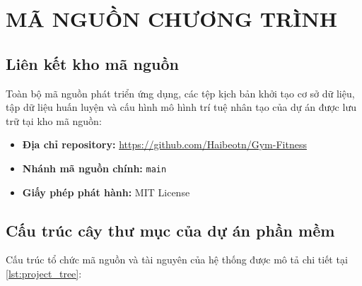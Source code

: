 
\chapter{MÃ NGUỒN CHƯƠNG TRÌNH}
\label{app:sourcecode}

\section{Liên kết kho mã nguồn}

Toàn bộ mã nguồn phát triển ứng dụng, các tệp kịch bản khởi tạo cơ sở dữ liệu, tập dữ liệu huấn luyện và cấu hình mô hình trí tuệ nhân tạo của dự án được lưu trữ tại kho mã nguồn:
\begin{itemize}[leftmargin=1.5cm]
    \item \textbf{Địa chỉ repository:} \url{https://github.com/Haibeotn/Gym-Fitness}
    \item \textbf{Nhánh mã nguồn chính:} \texttt{main}
    \item \textbf{Giấy phép phát hành:} MIT License
\end{itemize}

\section{Cấu trúc cây thư mục của dự án phần mềm}

Cấu trúc tổ chức mã nguồn và tài nguyên của hệ thống được mô tả chi tiết tại \cref{lst:project_tree}:

